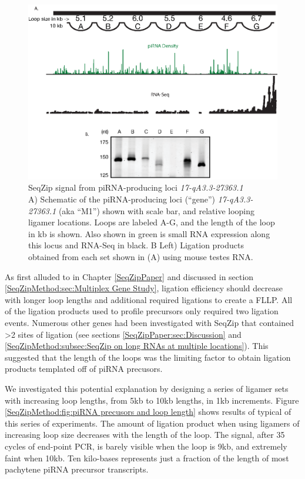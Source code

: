     \begin{figure} %
        \centering 
        \includegraphics{Figures/SeqZipMethod/piRNAPrecurserAnalyisBySeqZip.eps}
        \caption[SeqZip signal from piRNA-producing loci \textit{17-qA3.3-27363.1}]
        {
          SeqZip signal from piRNA-producing loci \textit{17-qA3.3-27363.1}\\[0.25cm]
          A) Schematic of the piRNA-producing loci (``gene'') \textit{17-qA3.3-27363.1} (aka ``M1'') shown with scale bar, and relative looping ligamer locations.  Loops are labeled A-G, and the length of the loop in kb is shown.  Also shown in green is small RNA expression along this locus and RNA-Seq in black. B Left) Ligation products obtained from each set shown in (A) using mouse testes RNA.
        	}
        \label{SeqZipMethod:fig:M1 analysis by SeqZip}
      	\end{figure}

    As first alluded to in Chapter \ref{SeqZipPaper} and discussed in section \ref{SeqZipMethod:sec:Multiplex Gene Study}, ligation efficiency should decrease with longer loop lengths and additional required ligations to create a FLLP. All of the ligation products used to profile precursors only required two ligation events. Numerous other genes had been investigated with SeqZip that contained >2 sites of ligation (see sections \ref{SeqZipPaper:sec:Discussion} and \ref{SeqZipMethod:subsec:SeqZip on long RNAs at multiple locations}). This suggested that the length of the loops was the limiting factor to obtain ligation products templated off of piRNA precusors.

    We investigated this potential explanation by designing a series of ligamer sets with increasing loop lengths, from 5kb to 10kb lengths, in 1kb increments. Figure \ref{SeqZipMethod:fig:piRNA precusors and loop length} shows results of typical of this series of experiments. The amount of ligation product when using ligamers of increasing loop size decreases with the length of the loop. The signal, after 35 cycles of end-point PCR, is barely visible when the loop is 9kb, and extremely faint when 10kb. Ten kilo-bases represents just a fraction of the length of most pachytene piRNA precursor transcripts. 

